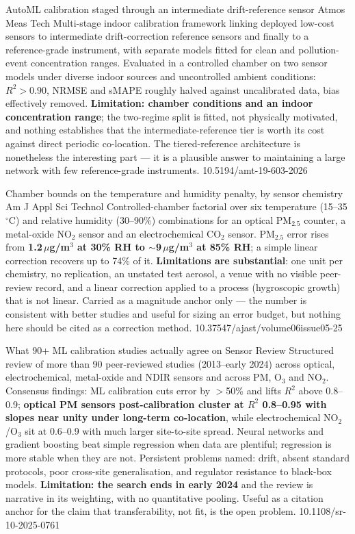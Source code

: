 \documentclass[10pt]{article}
\begin{document}
{AutoML calibration staged through an intermediate drift-reference sensor}
{Atmos Meas Tech}
{Multi-stage indoor calibration framework linking deployed low-cost sensors to
intermediate drift-correction reference sensors and finally to a reference-grade
instrument, with separate models fitted for clean and pollution-event concentration
ranges. Evaluated in a controlled chamber on two sensor models under diverse indoor
sources and uncontrolled ambient conditions: \textbf{$R^2 > 0.90$}, NRMSE and sMAPE
roughly halved against uncalibrated data, bias effectively removed. \textbf{Limitation:
chamber conditions and an indoor concentration range}; the two-regime split is fitted, not
physically motivated, and nothing establishes that the intermediate-reference tier is
worth its cost against direct periodic co-location. The tiered-reference architecture is
nonetheless the interesting part --- it is a plausible answer to maintaining a large
network with few reference-grade instruments.}
{10.5194/amt-19-603-2026}

{Chamber bounds on the temperature and humidity penalty, by sensor chemistry}
{Am J Appl Sci Technol}
{Controlled-chamber factorial over six temperature (15--35\,$^\circ$C) and relative
humidity (30--90\%) combinations for an optical PM$_{2.5}$ counter, a metal-oxide NO$_2$
sensor and an electrochemical CO$_2$ sensor. PM$_{2.5}$ error rises from
\textbf{1.2\,$\mu$g/m$^3$ at 30\% RH to $\sim$9\,$\mu$g/m$^3$ at 85\% RH}; a simple
linear correction recovers up to 74\% of it. \textbf{Limitations are substantial}: one
unit per chemistry, no replication, an unstated test aerosol, a venue with no visible
peer-review record, and a linear correction applied to a process (hygroscopic growth) that
is not linear. Carried as a magnitude anchor only --- the number is consistent with better
studies and useful for sizing an error budget, but nothing here should be cited as a
correction method.}
{10.37547/ajast/volume06issue05-25}

{What 90+ ML calibration studies actually agree on}
{Sensor Review}
{Structured review of more than 90 peer-reviewed studies (2013--early 2024) across
optical, electrochemical, metal-oxide and NDIR sensors and across PM, O$_3$ and NO$_2$.
Consensus findings: ML calibration cuts error by $>$50\% and lifts $R^2$ above 0.8--0.9;
\textbf{optical PM sensors post-calibration cluster at $R^2$ 0.8--0.95 with slopes near
unity under long-term co-location}, while electrochemical NO$_2$/O$_3$ sit at 0.6--0.9
with much larger site-to-site spread. Neural networks and gradient boosting beat simple
regression when data are plentiful; regression is more stable when they are not.
Persistent problems named: drift, absent standard protocols, poor cross-site
generalisation, and regulator resistance to black-box models. \textbf{Limitation: the
search ends in early 2024} and the review is narrative in its weighting, with no
quantitative pooling. Useful as a citation anchor for the claim that transferability, not
fit, is the open problem.}
{10.1108/sr-10-2025-0761}
\end{document}
